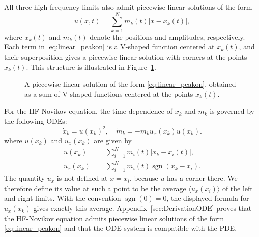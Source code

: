 \documentclass[english,master]{liumaiex}
\theoremstyle{thesisplain}
\theoremstyle{thesisdefinition}
\DeclareMathOperator{\sgn}{sgn}
\numberwithin{equation}{section}
\begin{document}
All three high-frequency limits also admit piecewise linear solutions of the form
\begin{equation} \label{eq:linear_peakon}
	u(x, t) = \sum_{k = 1}^{N} m_k(t) |x - x_k(t)|,
\end{equation}
where $x_k(t)$ and $m_k(t)$ denote the positions and amplitudes, respectively. Each term in \eqref{eq:linear_peakon} is a V-shaped function centered at $x_k(t)$, and their superposition gives a piecewise linear solution with corners at the points $x_k(t)$. This structure is illustrated in Figure~\ref{fig:linear-peakon-profile}.
\begin{figure}[H]
\centering
{}
\caption{A piecewise linear solution of the form \eqref{eq:linear_peakon}, obtained as a sum of V-shaped functions centered at the points $x_k(t)$.}
\label{fig:linear-peakon-profile}
\end{figure}
For the HF-Novikov equation, the time dependence of $x_k$ and $m_k$ is governed by the following ODEs:
\begin{equation} \label{eq:peakon_odes}
\dot{x}_k = u(x_k)^2, \quad
\dot{m}_k = -m_ku_x(x_k)u(x_k).
\end{equation}
where $u(x_k)$ and $u_x(x_k)$ are given by
\begin{align}
	u(x_k) &= \sum_{i = 1}^{N} m_i(t) |x_k - x_i(t)|, \\
	u_x(x_k) &= \sum_{i = 1}^{N} m_i(t) \sgn(x_k - x_i).
\end{align}
The quantity $u_x$ is not defined at $x=x_i$, because $u$ has a corner there. We therefore define its value at such a point to be the average $\langle u_x(x_i) \rangle$ of the left and right limits. With the convention $\sgn(0)=0$, the displayed formula for $u_x(x_k)$ gives exactly this average. Appendix~\ref{sec:DerivationODE} proves that the HF-Novikov equation admits piecewise linear solutions of the form \eqref{eq:linear_peakon} and that the ODE system is compatible with the PDE.
\end{document}
